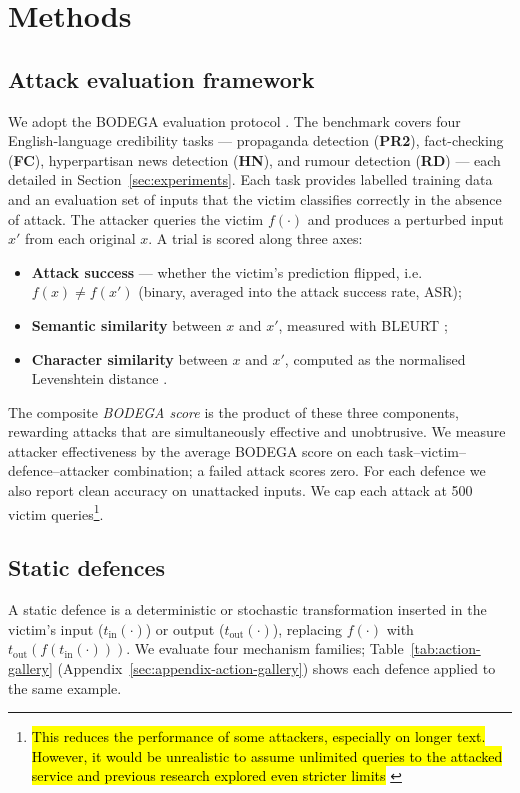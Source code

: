 \documentclass[11pt]{article}
\begin{document}
\section{Methods}

\subsection{Attack evaluation framework}
\label{sec:attack-framework}
We adopt the BODEGA evaluation protocol \cite{verifying_robustness}. The benchmark covers four English-language credibility tasks --- propaganda detection (\textbf{PR2}), fact-checking (\textbf{FC}), hyperpartisan news detection (\textbf{HN}), and rumour detection (\textbf{RD}) --- each detailed in Section~\ref{sec:experiments}. Each task provides labelled training data and an evaluation set of inputs that the victim classifies correctly in the absence of attack. The attacker queries the victim $f(\cdot)$ and produces a perturbed input $x'$ from each original $x$. A trial is scored along three axes:
\begin{itemize}
    \item \textbf{Attack success} --- whether the victim's prediction flipped, i.e. $f(x)\neq f(x')$ (binary, averaged into the attack success rate, ASR);
    \item \textbf{Semantic similarity} between $x$ and $x'$, measured with BLEURT \citep{Sellam2020};
    \item \textbf{Character similarity} between $x$ and $x'$, computed as the normalised Levenshtein distance \citep{1965}.
\end{itemize}
The composite \textit{BODEGA score} is the product of these three components, rewarding attacks that are simultaneously effective and unobtrusive. We measure attacker effectiveness by the average BODEGA score on each task--victim--defence--attacker combination; a failed attack scores zero. For each defence we also report clean accuracy on unattacked inputs. We cap each attack at 500 victim queries\footnote{\hl{This reduces the performance of some attackers, especially on longer text. However, it would be unrealistic to assume unlimited queries to the attacked service and previous research explored even stricter limits} \citep{Przybyla2025LLMattack}}.

\subsection{Static defences}
\label{sec:static-defences}
A static defence is a deterministic or stochastic transformation inserted in the victim's input ($t_\text{in}(\cdot)$) or output ($t_\text{out}(\cdot)$),  replacing $f(\cdot)$ with $t_\text{out}(f(t_\text{in}(\cdot)))$. We evaluate four mechanism families; Table~\ref{tab:action-gallery} (Appendix~\ref{sec:appendix-action-gallery}) shows each defence applied to the same example.
\end{document}
